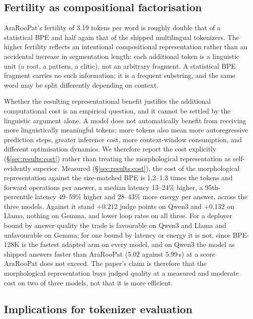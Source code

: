 \documentclass[a4paper,fleqn]{cas-sc}
\begin{document}
\subsection{Fertility as compositional factorisation}
\label{sec:discussion:fertility}

AraRooPat's fertility of 3.19 tokens per word is roughly double that of a statistical BPE and half again that of the shipped multilingual tokenizers. The higher fertility reflects an intentional compositional representation rather than an accidental increase in segmentation length: each additional token is a linguistic unit (a root, a pattern, a clitic), not an arbitrary fragment. A statistical BPE fragment carries no such information; it is a frequent substring, and the same word may be split differently depending on context.

Whether the resulting representational benefit justifies the additional computational cost is an empirical question, and it cannot be settled by the linguistic argument alone. A model does not automatically benefit from receiving more linguistically meaningful tokens; more tokens also mean more autoregressive prediction steps, greater inference cost, more context-window consumption, and different optimisation dynamics. We therefore report the cost explicitly (\S\ref{sec:results:cost}) rather than treating the morphological representation as self-evidently superior.
Measured (\S\ref{sec:results:cost}), the cost of the morphological representation against the size-matched BPE is 1.2--1.3 times the tokens and forward operations per answer, a median latency 13--24\% higher, a 95th-percentile latency 49--59\% higher and 28--43\% more energy per answer, across the three models. Against it stand $+0.212$ judge points on Qwen3 and $+0.132$ on Llama, nothing on Gemma, and lower loop rates on all three. For a deployer bound by answer quality the trade is favourable on Qwen3 and Llama and unfavourable on Gemma; for one bound by latency or energy it is not, since BPE-128K is the fastest adapted arm on every model, and on Qwen3 the model as shipped answers faster than AraRooPat (5.02 against 5.99\,s) at a score AraRooPat does not exceed. The paper's claim is therefore that the morphological representation buys judged quality at a measured and moderate cost on two of three models, not that it is more efficient.

\subsection{Implications for tokenizer evaluation}
\label{sec:discussion:eval}
\end{document}
